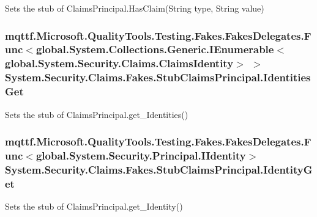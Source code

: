 Sets the stub of Claims\-Principal.\-Has\-Claim(\-String type, String value)

\hypertarget{class_system_1_1_security_1_1_claims_1_1_fakes_1_1_stub_claims_principal_a313766642e61968ad57957c2cd8202a0}{
\subsubsection[{Identities\-Get}]{\setlength{\rightskip}{0pt plus 5cm}mqttf.\-Microsoft.\-Quality\-Tools.\-Testing.\-Fakes.\-Fakes\-Delegates.\-Func$<$global.\-System.\-Collections.\-Generic.\-I\-Enumerable$<$global.\-System.\-Security.\-Claims.\-Claims\-Identity$>$ $>$ System.\-Security.\-Claims.\-Fakes.\-Stub\-Claims\-Principal.\-Identities\-Get}}\label{class_system_1_1_security_1_1_claims_1_1_fakes_1_1_stub_claims_principal_a313766642e61968ad57957c2cd8202a0}


Sets the stub of Claims\-Principal.\-get\-\_\-\-Identities()

\hypertarget{class_system_1_1_security_1_1_claims_1_1_fakes_1_1_stub_claims_principal_a95f3e5178aa9437dc6a424e956883df0}{
\subsubsection[{Identity\-Get}]{\setlength{\rightskip}{0pt plus 5cm}mqttf.\-Microsoft.\-Quality\-Tools.\-Testing.\-Fakes.\-Fakes\-Delegates.\-Func$<$global.\-System.\-Security.\-Principal.\-I\-Identity$>$ System.\-Security.\-Claims.\-Fakes.\-Stub\-Claims\-Principal.\-Identity\-Get}}\label{class_system_1_1_security_1_1_claims_1_1_fakes_1_1_stub_claims_principal_a95f3e5178aa9437dc6a424e956883df0}


Sets the stub of Claims\-Principal.\-get\-\_\-\-Identity()

